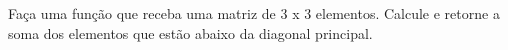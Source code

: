 
\question[10]

Faça uma função que receba uma matriz de 3 x 3 elementos. Calcule e retorne a soma dos elementos que estão abaixo da diagonal principal.
